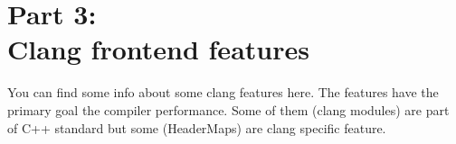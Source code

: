 \pagestyle{empty}
\pagecolor{Gray}
\color{black}

\chapter*{\textbf{Part 3:\\
    Clang frontend features}}

\begin{flushleft}

You can find some info about some clang features here. The features have the
primary goal the compiler performance. Some of them (clang modules) are part of
C++ standard but some (HeaderMaps) are clang specific feature. 
  
\end{flushleft}

\clearpage
\nopagecolor



\clearpage
